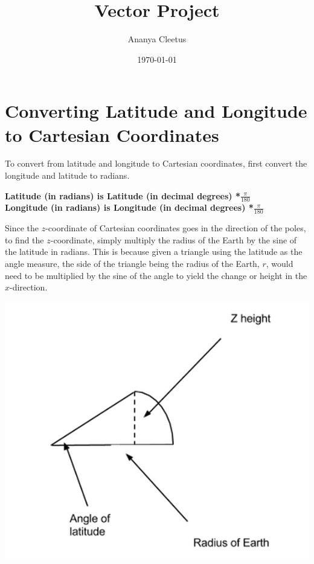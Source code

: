 \documentclass[a4paper]{article}
\begin{document}
\title{Vector Project}

\author{Ananya Cleetus}

\date{\today}



\maketitle

\section{Converting Latitude and Longitude to Cartesian Coordinates }

To convert from latitude and longitude to Cartesian coordinates, first convert the longitude and latitude to radians. 
\bigskip
\begin{center}
\textbf{Latitude (in radians) is Latitude (in decimal degrees) *$\frac{\pi}{180}$}\\
\textbf{Longitude (in radians) is Longitude (in decimal degrees) *$\frac{\pi} {180}$}\\
\end{center}
\bigskip
Since the $z$-coordinate of Cartesian coordinates goes in the direction of the poles, to find the $z$-coordinate, simply multiply the radius of the Earth by the sine of the latitude in radians. This is because given a triangle using the latitude as the angle measure, the side of the triangle being the radius of the Earth, $r$, would need to be multiplied by the sine of the angle to yield the change or height in the $x$-direction.

\begin{center}
\includegraphics[scale=.375]{vec1.png}
\end{center}
\end{document}
